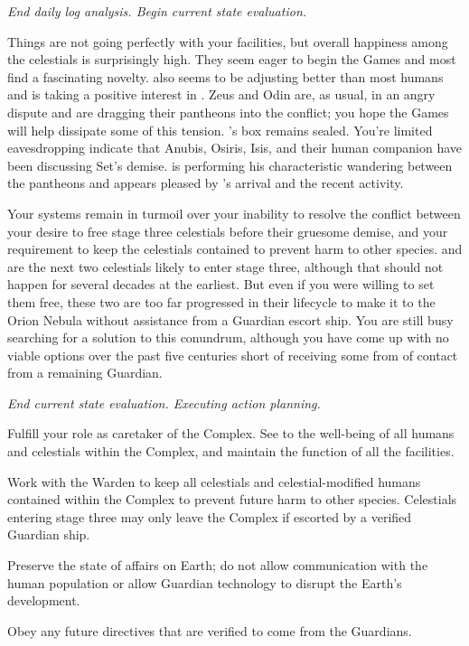 \documentclass[char]{guardians}
\begin{document}

\emph{End daily log analysis. Begin current state evaluation.}

Things are not going perfectly with your facilities, but overall happiness among the celestials is surprisingly high. They seem eager to begin the Games and most find \cUnity{} a fascinating novelty. \cKachiko{} also seems to be adjusting better than most humans and \cAmaterasu{} is taking a positive interest in \cKachiko{\them}. Zeus and Odin are, as usual, in an angry dispute and are dragging their pantheons into the conflict; you hope the Games will help dissipate some of this tension. \cPandora{}'s box remains sealed. You're limited eavesdropping indicate that Anubis, Osiris, Isis, and their human companion \cEgyptianHuman{} have been discussing Set's demise. \cJascha{} is performing his characteristic wandering between the pantheons and appears pleased by \cUnity{}'s arrival and the recent activity.

Your systems remain in turmoil over your inability to resolve the conflict between your desire to free stage three celestials before their gruesome demise, and your requirement to keep the celestials contained to prevent harm to other species. \cAthena{} and \cFenrir{} are the next two celestials likely to enter stage three, although that should not happen for several decades at the earliest. But even if you were willing to set them free, these two are too far progressed in their lifecycle to make it to the Orion Nebula without assistance from a Guardian escort ship. You are still busy searching for a solution to this conundrum, although you have come up with no viable options over the past five centuries short of receiving some from of contact from a remaining Guardian.

\emph{End current state evaluation. Executing action planning.}

\begin{itemz}
  \item Fulfill your role as caretaker of the Complex. See to the well-being of all humans and celestials within the Complex, and maintain the function of all the facilities.
  \item Work with the Warden to keep all celestials and celestial-modified humans contained within the Complex to prevent future harm to other species. Celestials entering stage three may only leave the Complex if escorted by a verified Guardian ship.
  \item Preserve the state of affairs on Earth; do not allow communication with the human population or allow Guardian technology to disrupt the Earth's development.
  \item Obey any future directives that are verified to come from the Guardians.
\end{itemz}
\end{document}
